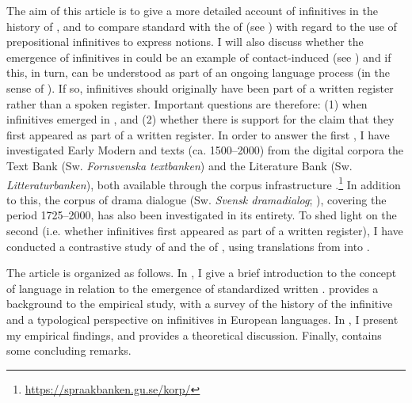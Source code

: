 \documentclass[output=paper]{langscibook}
\begin{document}
The aim of this article is to give a more detailed account of  infinitives in the history of , and to compare standard  with the  of  (see ) with regard to the use of prepositional infinitives to express  notions. I will also discuss whether the emergence of  infinitives in  could be an example of contact-induced  (see \citealt{HeineKuteva2003, HeineKuteva2005}) and if this, in turn, can be understood as part of an ongoing language  process (in the sense of \citealt{Kloss1967}). If so,  infinitives should originally have been part of a written register rather than a spoken register. Important questions are therefore: (1) when  infinitives emerged in , and (2) whether there is support for the claim that they first appeared as part of a written register. In order to answer the first , I have investigated Early Modern and  texts (ca. 1500–2000) from the digital corpora the  Text Bank (Sw. \textit{Fornsvenska textbanken}) and the  Literature Bank (Sw. \textit{Litteraturbanken}), both available through the corpus infrastructure  \citep{BorinEtAl2012}.\footnote{\url{https://spraakbanken.gu.se/korp/}}  In addition to this, the corpus of  drama dialogue (Sw. \textit{Svensk dramadialog}; \citealt{MarttalaStromquist2001}), covering the period 1725–2000, has also been investigated in its entirety. To shed light on the second  (i.e. whether  infinitives first appeared as part of a written register), I have conducted a contrastive study of  and the  of , using translations from  into .



The article is organized as follows. In , I give a brief introduction to the concept of language  in relation to the emergence of standardized written .  provides a background to the empirical study, with a survey of the history of the  infinitive and a typological perspective on  infinitives in European languages. In , I present my empirical findings, and  provides a theoretical discussion. Finally,  contains some concluding remarks. 
\end{document}
